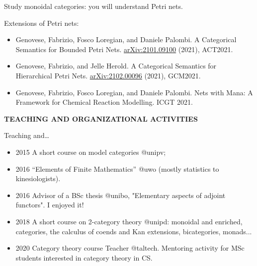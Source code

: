 \documentclass[handout]{beamer}
\begin{document}
\begin{frame}
\begin{center}
\end{center}
\begin{center}
  Study monoidal categories: you will understand Petri nets.
\end{center}
\end{frame}
\begin{frame}
Extensions of Petri nets:
\begin{itemize}
  \item Genovese, Fabrizio, Fosco Loregian, and Daniele Palombi.
  \alert{A Categorical Semantics for Bounded Petri Nets.}
   \href{https://arxiv.org/pdf/2101.09100}{arXiv:2101.09100} (2021), ACT2021.
  \item Genovese, Fabrizio, and Jelle Herold.
  \alert{A Categorical Semantics for Hierarchical Petri Nets.}
   \href{https://arxiv.org/pdf/2102.00096}{arXiv:2102.00096} (2021), GCM2021.
  \item Genovese, Fabrizio, Fosco Loregian, and Daniele Palombi.
  \alert{Nets with Mana: A Framework for Chemical Reaction Modelling.}
   ICGT 2021.
\end{itemize}
\end{frame}
%
%
%
%
%
\begin{frame}
  \Huge\centering \bfseries TEACHING AND ORGANIZATIONAL ACTIVITIES
\end{frame}
%
\begin{frame}{Teaching and\dots}\small
  \begin{itemize}
    \item<+-> 2015 A short course on \alert{model categories} {\color{magenta} @unipv};
    \item<+-> 2016 ``\alert{Elements of Finite Mathematics}'' {\color{magenta} @uwo} (mostly statistics to kinesiologists).
    \item<+-> 2016 \alert{Advisor} of a BSc thesis {\color{magenta} @unibo}, "Elementary aspects of adjoint functors". I enjoyed it!
    \item<+-> 2018 A short course on \alert{2-category theory} {\color{magenta} @unipd}: monoidal and enriched, categories, the calculus of coends and Kan extensions, bicategories, monads...
    \item<+-> 2020 \alert{Category theory} course Teacher {\color{magenta} @taltech}. Mentoring activity for MSc students interested in category theory in CS.
\end{itemize}
\end{frame}
\end{document}
